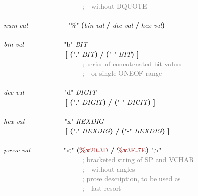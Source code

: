 \documentclass{article}
\renewcommand{\textsuperscript}[1]{\raisebox{0.8ex}{#1}}
\begin{document}
{\mbox{~~~~~~~~~~~~~~~~~~~~~~~}\textcolor{gray}{;\mbox{~~}without DQUOTE}\\
\\
\emph{num-{}val}\mbox{~~~~~~~~}\textbf{=}\mbox{~~}\textcolor{BrickRed}{"\%{}"} \textbf{(}\emph{bin-{}val} \textbf{/} \emph{dec-{}val} \textbf{/} \emph{hex-{}val}\textbf{)}\\
\\
\emph{bin-{}val}\mbox{~~~~~~~~}\textbf{=}\mbox{~~}\textcolor{BrickRed}{"b"} \textcolor{teal}{\emph{\textsuperscript{1*}}}\emph{BIT}\\
\mbox{~~~~~~~~~~~~~~~~~~}\textbf{[} \textcolor{teal}{\emph{\textsuperscript{1*}}}\textbf{(}\textcolor{BrickRed}{"."} \textcolor{teal}{\emph{\textsuperscript{1*}}}\emph{BIT}\textbf{)} \textbf{/} \textbf{(}\textcolor{BrickRed}{"-{}"} \textcolor{teal}{\emph{\textsuperscript{1*}}}\emph{BIT}\textbf{)} \textbf{]}\\
\mbox{~~~~~~~~~~~~~~~~~~~~~~~}\textcolor{gray}{; series of concatenated bit values}\\
\mbox{~~~~~~~~~~~~~~~~~~~~~~~}\textcolor{gray}{;\mbox{~~}or single ONEOF range}\\
\\
\emph{dec-{}val}\mbox{~~~~~~~~}\textbf{=}\mbox{~~}\textcolor{BrickRed}{"d"} \textcolor{teal}{\emph{\textsuperscript{1*}}}\emph{DIGIT}\\
\mbox{~~~~~~~~~~~~~~~~~~}\textbf{[} \textcolor{teal}{\emph{\textsuperscript{1*}}}\textbf{(}\textcolor{BrickRed}{"."} \textcolor{teal}{\emph{\textsuperscript{1*}}}\emph{DIGIT}\textbf{)} \textbf{/} \textbf{(}\textcolor{BrickRed}{"-{}"} \textcolor{teal}{\emph{\textsuperscript{1*}}}\emph{DIGIT}\textbf{)} \textbf{]}\\
\\
\emph{hex-{}val}\mbox{~~~~~~~~}\textbf{=}\mbox{~~}\textcolor{BrickRed}{"x"} \textcolor{teal}{\emph{\textsuperscript{1*}}}\emph{HEXDIG}\\
\mbox{~~~~~~~~~~~~~~~~~~}\textbf{[} \textcolor{teal}{\emph{\textsuperscript{1*}}}\textbf{(}\textcolor{BrickRed}{"."} \textcolor{teal}{\emph{\textsuperscript{1*}}}\emph{HEXDIG}\textbf{)} \textbf{/} \textbf{(}\textcolor{BrickRed}{"-{}"} \textcolor{teal}{\emph{\textsuperscript{1*}}}\emph{HEXDIG}\textbf{)} \textbf{]}\\
\\
\emph{prose-{}val}\mbox{~~~~~~}\textbf{=}\mbox{~~}\textcolor{BrickRed}{"\textless{}"} \textcolor{teal}{\emph{\textsuperscript{*}}}\textbf{(}\textcolor{Brown}{\textbf{\%{}x}20\textbf{-}3D} \textbf{/} \textcolor{Brown}{\textbf{\%{}x}3F\textbf{-}7E}\textbf{)} \textcolor{BrickRed}{"\textgreater{}"}\\
\mbox{~~~~~~~~~~~~~~~~~~~~~~~}\textcolor{gray}{; bracketed string of SP and VCHAR}\\
\mbox{~~~~~~~~~~~~~~~~~~~~~~~}\textcolor{gray}{;\mbox{~~}without angles}\\
\mbox{~~~~~~~~~~~~~~~~~~~~~~~}\textcolor{gray}{; prose description, to be used as}\\
\mbox{~~~~~~~~~~~~~~~~~~~~~~~}\textcolor{gray}{;\mbox{~~}last resort}\\
\\

}
\end{document}
